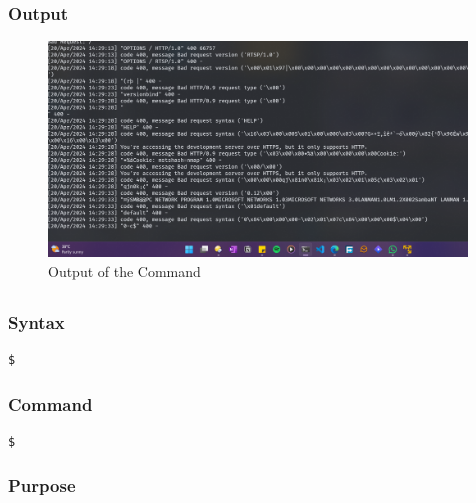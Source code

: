 \documentclass[11pt]{article}
\begin{document}
\subsubsection*{Output}
\begin{figure}[H]
    \centering
    \includegraphics[width=0.99\textwidth]{a3_ss (13).png}
    \caption{Output of the Command}
\end{figure}


\subsection{}

\subsubsection*{Syntax}
\begin{verbatim}
$
\end{verbatim}

\subsubsection*{Command}
\begin{verbatim}
$
\end{verbatim}

\subsubsection*{Purpose}
\end{document}
